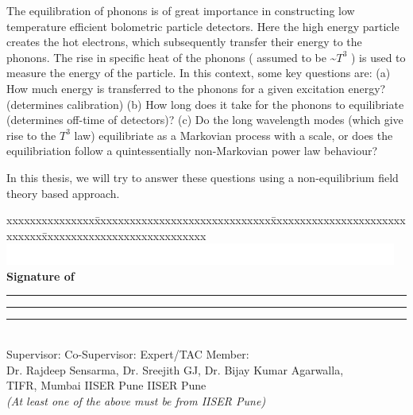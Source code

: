 \documentclass[10pt]{article}
\begin{document}
The equilibration of phonons is of great importance in constructing low temperature efficient  bolometric particle detectors. Here the high energy particle creates the hot electrons, which subsequently transfer their energy to the phonons. The rise in specific heat of the phonons ( assumed to be \textasciitilde $T^3$ ) is used to measure the energy of the particle. In this context, some key questions are: (a) How much energy is transferred to the phonons for a given excitation energy? (determines calibration) (b) How long does it take for the phonons to equilibriate (determines off-time of detectors)? (c) Do the long wavelength modes (which give rise to the $T^3$ law) equilibriate  as a Markovian process with a scale, or does the equilibriation follow a quintessentially non-Markovian power law behaviour\cite{chakraborty2018power}? 

In this thesis, we will try to answer these questions using a non-equilibrium field theory based approach.


\printbibliography




\begin{tabbing}
xxxxxxxxxxxxxxx\=xxxxxxxxxxxxxxxxxxxxxxxxxxxxxx\=xxxxxxxxxxxxxxxxxxxxxxxxxxxxx\=xxxxxxxxxxxxxxxxxxxxxxxxxxxx\kill
\\
\>\includegraphics[width=4.3cm]{sign.png}\>\includegraphics[width=4.3cm]{sign.png}\>\includegraphics[width=4.3cm]{sign.png}\\
{\bfseries Signature of}  \> \rule{4.3cm}{1pt} \> \rule{4.3cm}{1pt}\>\rule{4.3cm}{1pt} \\
\> {\small Supervisor: } \>	{\small Co-Supervisor:} \> {\small Expert/TAC Member:} \\
\> {\small Dr. Rajdeep Sensarma,} \>	{\small Dr. Sreejith GJ,} \> {\small Dr. Bijay Kumar Agarwalla,} \\
\> {\small TIFR, Mumbai} \>	{\small IISER Pune} \> {\small IISER Pune} \\
\> \emph{(At least one of the above must be from IISER Pune)}
\end{tabbing}
\end{document}
